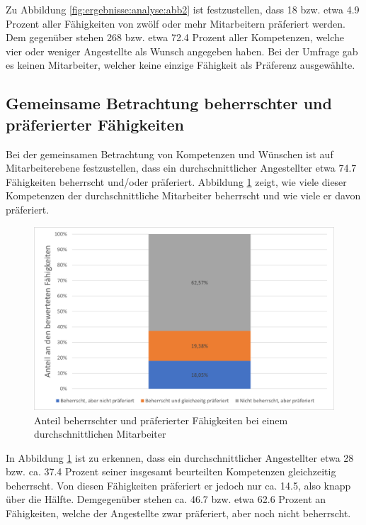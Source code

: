 Zu Abbildung \ref{fig:ergebnisse:analyse:abb2} ist festzustellen, dass 18 bzw. etwa 4.9 Prozent aller Fähigkeiten von zwölf oder mehr Mitarbeitern präferiert werden. Dem gegenüber stehen 268 bzw. etwa 72.4 Prozent aller Kompetenzen, welche vier oder weniger Angestellte als Wunsch angegeben haben. Bei der Umfrage gab es keinen Mitarbeiter, welcher keine einzige Fähigkeit als Präferenz ausgewählte.

\subsection{Gemeinsame Betrachtung beherrschter und präferierter Fähigkeiten}
\label{ch:ergebnisse:analyse:gemeinsam}
Bei der gemeinsamen Betrachtung von Kompetenzen und Wünschen ist auf Mitarbeiterebene festzustellen, dass ein durchschnittlicher Angestellter etwa 74.7 Fähigkeiten beherrscht und/oder präferiert. Abbildung \ref{fig:ergebnisse:analyse:abb3} zeigt, wie viele dieser Kompetenzen der durchschnittliche Mitarbeiter beherrscht und wie viele er davon präferiert.

\begin{figure}[h]
	\centering
	\includegraphics[width=1\textwidth]{gfx/auswertung-anteil-an-faehigkeiten.png}
	\caption{Anteil beherrschter und präferierter Fähigkeiten bei einem durchschnittlichen Mitarbeiter}
	\label{fig:ergebnisse:analyse:abb3}
\end{figure}

In Abbildung \ref{fig:ergebnisse:analyse:abb3} ist zu erkennen, dass ein durchschnittlicher Angestellter etwa 28 bzw. ca. 37.4 Prozent seiner insgesamt beurteilten Kompetenzen gleichzeitig beherrscht. Von diesen Fähigkeiten präferiert er jedoch nur ca. 14.5, also knapp über die Hälfte. Demgegenüber stehen ca. 46.7 bzw. etwa 62.6 Prozent an Fähigkeiten, welche der Angestellte zwar präferiert, aber noch nicht beherrscht.

